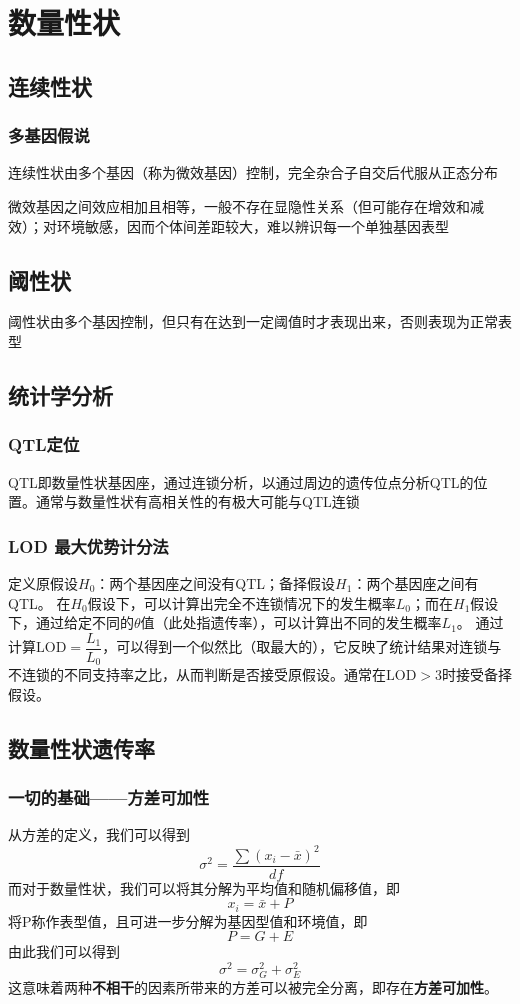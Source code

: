 \documentclass[a4paper, 12pt]{report}
\begin{document}
\chapter{数量性状}
\section{连续性状}
\subsection{多基因假说}
连续性状由多个基因（称为微效基因）控制，完全杂合子自交后代服从正态分布

微效基因之间效应相加且相等，一般不存在显隐性关系（但可能存在增效和减效）；对环境敏感，因而个体间差距较大，难以辨识每一个单独基因表型
\section{阈性状}
阈性状由多个基因控制，但只有在达到一定阈值时才表现出来，否则表现为正常表型
\section{统计学分析}
\subsection{QTL定位}
QTL即数量性状基因座，通过连锁分析，以通过周边的遗传位点分析QTL的位置。通常与数量性状有高相关性的有极大可能与QTL连锁
\subsection{LOD 最大优势计分法}
定义原假设\(H_0\)：两个基因座之间没有QTL；备择假设\(H_1\)：两个基因座之间有QTL。
在\(H_0\)假设下，可以计算出完全不连锁情况下的发生概率\(L_0\)；而在\(H_1\)假设下，通过给定不同的\(\theta\)值（此处指遗传率），可以计算出不同的发生概率\(L_1\)。
通过计算\(\mathrm{LOD} = \dfrac{L_1}{L_0}\)，可以得到一个似然比（取最大的），它反映了统计结果对连锁与不连锁的不同支持率之比，从而判断是否接受原假设。通常在\(\mathrm{LOD} > 3\)时接受备择假设。
\section{数量性状遗传率}
\subsection{一切的基础——方差可加性}
从方差的定义，我们可以得到\[\sigma^2 = \dfrac{\sum(x_i-\bar{x})^2}{df}\]
而对于数量性状，我们可以将其分解为平均值和随机偏移值，即\[x_i=\bar{x}+P\]
将P称作表型值，且可进一步分解为基因型值和环境值，即\[P=G+E\]
由此我们可以得到\[\sigma^2 = \sigma^2_G + \sigma^2_E\]
这意味着两种\textbf{不相干}的因素所带来的方差可以被完全分离，即存在\textbf{方差可加性}。
\end{document}
